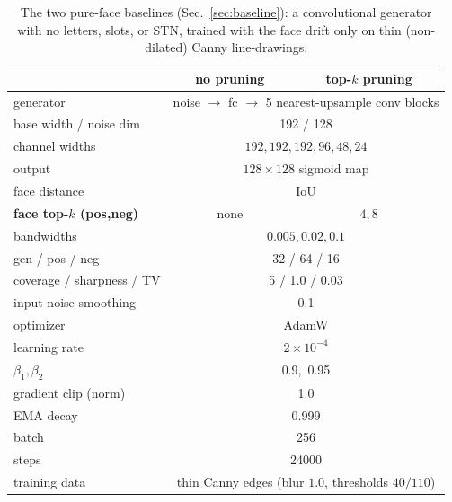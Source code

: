 \documentclass{article}
\begin{document}
\begin{table}[h]
  \caption{The two pure-face baselines (Sec.~\ref{sec:baseline}): a convolutional generator with no
  letters, slots, or STN, trained with the face drift only on thin (non-dilated) Canny line-drawings.}
  \label{tab:app_pure}
  \centering\small
  \begin{tabular}{lcc}
    \toprule
     & no pruning & top-$k$ pruning \\
    \midrule
    generator                      & \multicolumn{2}{c}{noise $\to$ fc $\to$ 5 nearest-upsample conv blocks} \\
    base width / noise dim         & \multicolumn{2}{c}{192 / 128} \\
    channel widths                 & \multicolumn{2}{c}{$192,192,192,96,48,24$} \\
    output                         & \multicolumn{2}{c}{$128{\times}128$ sigmoid map} \\
    \midrule
    face distance                  & \multicolumn{2}{c}{IoU} \\
    \textbf{face top-$k$ (pos,neg)}& none & $4,8$ \\
    bandwidths                     & \multicolumn{2}{c}{$0.005,0.02,0.1$} \\
    gen / pos / neg                & \multicolumn{2}{c}{32 / 64 / 16} \\
    coverage / sharpness / TV      & \multicolumn{2}{c}{5 / 1.0 / 0.03} \\
    input-noise smoothing          & \multicolumn{2}{c}{0.1} \\
    \midrule
    optimizer                      & \multicolumn{2}{c}{AdamW} \\
    learning rate                  & \multicolumn{2}{c}{$2\times10^{-4}$} \\
    $\beta_1,\beta_2$              & \multicolumn{2}{c}{0.9,\ 0.95} \\
    gradient clip (norm)           & \multicolumn{2}{c}{1.0} \\
    EMA decay                      & \multicolumn{2}{c}{0.999} \\
    batch                          & \multicolumn{2}{c}{256} \\
    steps                          & \multicolumn{2}{c}{24000} \\
    training data                  & \multicolumn{2}{c}{thin Canny edges (blur $1.0$, thresholds $40/110$)} \\
    \bottomrule
  \end{tabular}
\end{table}
\end{document}
